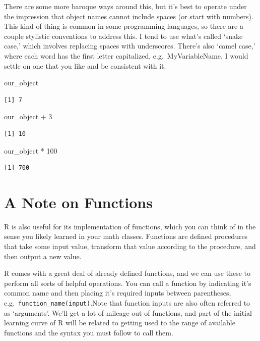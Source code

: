 \documentclass[
  letterpaper,
  DIV=11,
  numbers=noendperiod]{scrreprt}
\newenvironment{Shaded}{\begin{snugshade}}{\end{snugshade}}
\newcommand{\DecValTok}[1]{\textcolor[rgb]{0.68,0.00,0.00}{#1}}
\newcommand{\NormalTok}[1]{\textcolor[rgb]{0.00,0.23,0.31}{#1}}
\newcommand{\SpecialCharTok}[1]{\textcolor[rgb]{0.37,0.37,0.37}{#1}}
\begin{document}
There are some more baroque ways around this, but it's best to operate
under the impression that object names cannot include spaces (or start
with numbers). This kind of thing is common in some programming
languages, so there are a couple stylistic conventions to address this.
I tend to use what's called `snake case,' which involves replacing
spaces with underscores. There's also `camel case,' where each word has
the first letter capitalized, e.g.~MyVariableName. I would settle on one
that you like and be consistent with it.

\begin{Shaded}
\begin{Highlighting}[]
\NormalTok{our\_object}
\end{Highlighting}
\end{Shaded}

\begin{verbatim}
[1] 7
\end{verbatim}

\begin{Shaded}
\begin{Highlighting}[]
\NormalTok{our\_object }\SpecialCharTok{+} \DecValTok{3}
\end{Highlighting}
\end{Shaded}

\begin{verbatim}
[1] 10
\end{verbatim}

\begin{Shaded}
\begin{Highlighting}[]
\NormalTok{our\_object }\SpecialCharTok{*} \DecValTok{100}
\end{Highlighting}
\end{Shaded}

\begin{verbatim}
[1] 700
\end{verbatim}

\section{A Note on Functions}\label{a-note-on-functions}

R is also useful for its implementation of functions, which you can
think of in the sense you likely learned in your math classes. Functions
are defined procedures that take some input value, transform that value
according to the procedure, and then output a new value.

R comes with a great deal of already defined functions, and we can use
these to perform all sorts of helpful operations. You can call a
function by indicating it's common name and then placing it's required
inputs between parentheses, e.g.~\texttt{function\_name(input)}.Note
that function inputs are also often referred to as `arguments'. We'll
get a lot of mileage out of functions, and part of the initial learning
curve of R will be related to getting used to the range of available
functions and the syntax you must follow to call them.
\end{document}
